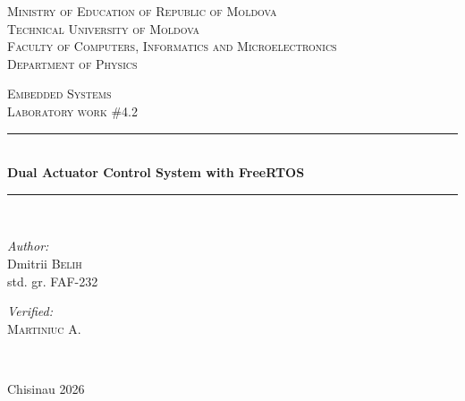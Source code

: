 \documentclass[12pt]{article}
\begin{document}
\begin{titlepage}
	\thispagestyle{empty}

	\begin{center}
		\textsc{\large Ministry of Education of Republic of Moldova}\\[0.5cm]
		\textsc{\large Technical University of Moldova}\\[0.5cm]
		\textsc{\large Faculty of Computers, Informatics and Microelectronics}\\[0.5cm]
		\textsc{\large Department of Physics}\\[1.2cm]
	\end{center}

	\vspace{25 mm}

	\begin{center}
		\textsc{\Large Embedded Systems}\\[0.5cm]
		\textsc{\large Laboratory work \#4.2}\\[0.5cm]

		\newcommand{\HRule}{\rule{\linewidth}{0.5mm}}
		\vspace{10 mm}
		\HRule \\[0.4cm]
		{ \LARGE \bfseries Dual Actuator Control System with FreeRTOS}\\[0.4cm]
		\HRule \\[1.5cm]
	\end{center}

	\vspace{10mm}

	\begin{minipage}[t]{0.4\textwidth}
		\begin{flushleft} \large
			\emph{Author:} \\
			Dmitrii \textsc{Belih}\\
			std. gr. FAF-232
		\end{flushleft}
	\end{minipage}
	\hfill
	\begin{minipage}[t]{0.4\textwidth}
		\begin{flushright} \large
			\emph{Verified:} \\
			\textsc{Martiniuc} A.\\
		\end{flushright}
	\end{minipage}\\[3cm]

	\vspace{5 mm}
	\begin{center}
		\large Chisinau 2026 \\[0.5cm]
	\end{center}

	\vfill
\end{titlepage}
\end{document}
